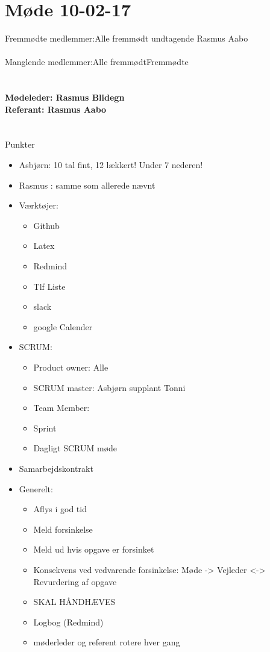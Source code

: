 \documentclass[12pt]{article}
\begin{document}
\section*{Møde 10-02-17}

Fremmødte medlemmer:Alle fremmødt undtagende Rasmus Aabo\\\\
Manglende medlemmer:Alle fremmødtFremmødte\\\\ 
\\\textbf{Mødeleder: Rasmus Blidegn}
\\\textbf{Referant: Rasmus Aabo}
\\\\\\
Punkter
\begin{itemize}
\item Asbjørn: 10 tal fint, 12 lækkert! Under 7 nederen!
\item Rasmus : samme som allerede  nævnt
\item Værktøjer:

\begin{itemize}
	\item Github
	\item Latex
	\item Redmind
	\item Tlf Liste
	\item slack
	\item google Calender
\end{itemize} 
\item SCRUM:
\begin{itemize}
	\item Product owner: Alle
	\item SCRUM master: Asbjørn supplant Tonni
	\item Team Member:
	\item Sprint
	\item Dagligt SCRUM møde
\end{itemize}

\item Samarbejdskontrakt
\item Generelt:
\begin{itemize}
	\item Aflys i god tid
	\item Meld forsinkelse
	\item Meld ud hvis opgave er forsinket
	\item Konsekvens ved vedvarende forsinkelse: Møde -> Vejleder <-> Revurdering af opgave 
	\item SKAL HÅNDHÆVES
	\item Logbog (Redmind)
	\item møderleder og referent rotere hver gang
\end{itemize}


\end{itemize}
\end{document}
